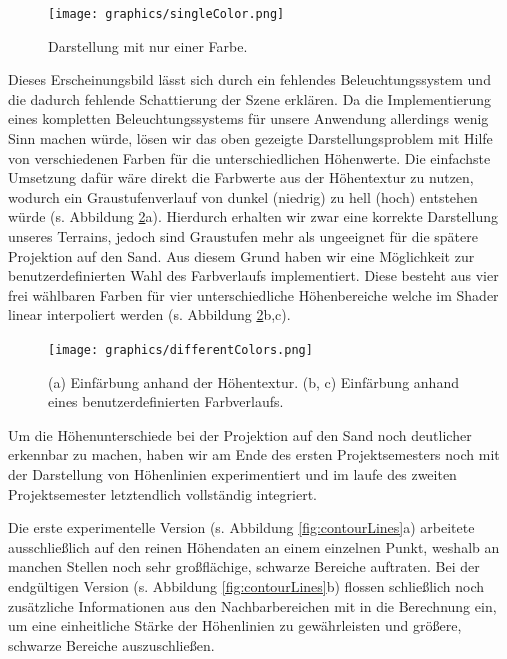 \begin{Spacing}{\mylinespace}
\begin{figure}[h!]
	\centering
	\vspace*{20px}
	\texttt{[image: graphics/singleColor.png]}
	\caption{Darstellung mit nur einer Farbe.}
	\label{fig:singleColors}
\end{figure}

Dieses Erscheinungsbild lässt sich durch ein fehlendes Beleuchtungssystem und die dadurch fehlende Schattierung der Szene erklären. Da die Implementierung eines kompletten Beleuchtungssystems für unsere Anwendung allerdings wenig Sinn machen würde, lösen wir das oben gezeigte Darstellungsproblem mit Hilfe von verschiedenen Farben für die unterschiedlichen Höhenwerte. Die einfachste Umsetzung dafür wäre direkt die Farbwerte aus der Höhentextur zu nutzen, wodurch ein Graustufenverlauf von dunkel (niedrig) zu hell (hoch) entstehen würde (s. Abbildung \ref{fig:differentColors}a). Hierdurch erhalten wir zwar eine korrekte Darstellung unseres Terrains, jedoch sind Graustufen mehr als ungeeignet für die spätere Projektion auf den Sand. Aus diesem Grund haben wir eine Möglichkeit zur benutzerdefinierten Wahl des Farbverlaufs implementiert. Diese besteht aus vier frei wählbaren Farben für vier unterschiedliche Höhenbereiche welche im Shader linear interpoliert werden (s. Abbildung \ref{fig:differentColors}b,c).    

\begin{figure}[h!]
	\centering
	\vspace*{30px}
	\texttt{[image: graphics/differentColors.png]}
	\caption{(a) Einfärbung anhand der Höhentextur. (b, c) Einfärbung anhand eines benutzerdefinierten Farbverlaufs.}
	\label{fig:differentColors}
\end{figure}

Um die Höhenunterschiede bei der Projektion auf den Sand noch deutlicher erkennbar zu machen, haben wir am Ende des ersten Projektsemesters noch mit der Darstellung von Höhenlinien experimentiert und im laufe des zweiten Projektsemester letztendlich vollständig integriert.

Die erste experimentelle Version (s. Abbildung \ref{fig:contourLines}a) arbeitete ausschließlich auf den reinen Höhendaten an einem einzelnen Punkt, weshalb an manchen Stellen noch sehr großflächige, schwarze Bereiche auftraten. Bei der endgültigen Version (s. Abbildung \ref{fig:contourLines}b) flossen schließlich noch zusätzliche Informationen aus den Nachbarbereichen mit in die Berechnung ein, um eine einheitliche Stärke der Höhenlinien zu gewährleisten und größere, schwarze Bereiche auszuschließen.  



\end{Spacing}
